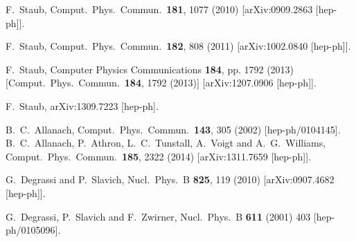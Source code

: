 \documentclass[12pt,a4paper]{article}
\begin{document}
\begin{thebibliography}{999}
  F.~Staub,
  Comput.\ Phys.\ Commun.\  {\bf 181}, 1077 (2010)
  [arXiv:0909.2863 [hep-ph]].

  F.~Staub,
  Comput.\ Phys.\ Commun.\  {\bf 182}, 808 (2011)
  [arXiv:1002.0840 [hep-ph]].

  F.~Staub,
  Computer Physics Communications {\bf 184}, pp. 1792 (2013)
  [Comput.\ Phys.\ Commun.\  {\bf 184}, 1792 (2013)]
  [arXiv:1207.0906 [hep-ph]].

  F.~Staub,
  arXiv:1309.7223 [hep-ph].

  B.~C.~Allanach,
  Comput.\ Phys.\ Commun.\  {\bf 143}, 305 (2002)
  [hep-ph/0104145].
  B.~C.~Allanach, P.~Athron, L.~C.~Tunstall, A.~Voigt and A.~G.~Williams,
  Comput.\ Phys.\ Commun.\  {\bf 185}, 2322 (2014)
  [arXiv:1311.7659 [hep-ph]].


  G.~Degrassi and P.~Slavich,
  Nucl.\ Phys.\ B {\bf 825}, 119 (2010)
  [arXiv:0907.4682 [hep-ph]].

  G.~Degrassi, P.~Slavich and F.~Zwirner,
  Nucl.\ Phys.\ B {\bf 611} (2001) 403
  [hep-ph/0105096].


\end{thebibliography}
\end{document}
